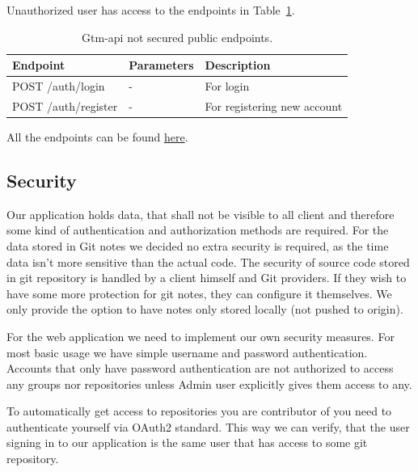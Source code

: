 Unauthorized user has access to the endpoints in Table~\ref{tab:gtm-api-endpoints-public}.
\begin{table}[H]
    \centering
    \begin{tabular}{ | p{4cm} | p{4cm} | p{4cm} |}
        \hline
        Endpoint & Parameters & Description\\
        \hline
        POST /auth/login & - & For login \\
        \hline
        POST /auth/register & - & For registering new account \\
        \hline
    \end{tabular}
    \caption{Gtm-api not secured public endpoints.}
    \label{tab:gtm-api-endpoints-public}
\end{table}

All the endpoints can be found \href{https://cs.ttu.ee/services/gtm/api/swagger/index.html}{here}.

\subsection{Security}\label{subsec:scurity}
Our application holds data, that shall not be visible to all client and therefore some kind of authentication and authorization methods are required.
For the data stored in Git notes we decided no extra security is required, as the time data isn't more sensitive than the actual code.
The security of source code stored in git repository is handled by a client himself and Git providers.
If they wish to have some more protection for git notes, they can configure it themselves.
We only provide the option to have notes only stored locally (not pushed to origin).

For the web application we need to implement our own security measures.
For most basic usage we have simple username and password authentication.
Accounts that only have password authentication are not authorized to access any groups nor repositories unless Admin user
explicitly gives them access to any.

To automatically get access to repositories you are contributor of you need to authenticate yourself via OAuth2 standard.
This way we can verify, that the user signing in to our application is the same user that has access to some git repository.

